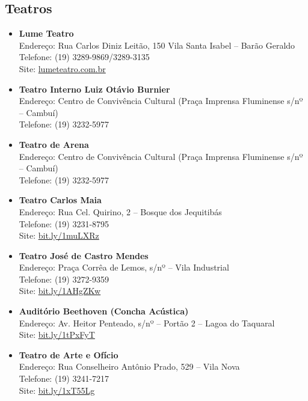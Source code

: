 \subsection{Teatros}

\begin{itemize}
\item \textbf{Lume Teatro}
  \\Endereço:  Rua Carlos Diniz Leitão, 150 Vila Santa Isabel -- Barão Geraldo
  \\Telefone: (19) 3289-9869/3289-3135
  \\Site: \url{lumeteatro.com.br}

\item \textbf{Teatro Interno Luiz Otávio Burnier}
  \\Endereço: Centro de Convivência Cultural (Praça Imprensa Fluminense s/nº --
  Cambuí)
  \\Telefone: (19) 3232-5977

\item \textbf{Teatro de Arena}
  \\Endereço: Centro de Convivência Cultural (Praça Imprensa Fluminense s/nº --
  Cambuí)
  \\Telefone: (19) 3232-5977

\item \textbf{Teatro Carlos Maia}
  \\Endereço: Rua Cel. Quirino, 2 -- Bosque dos Jequitibás
  \\Telefone: (19) 3231-8795
  \\Site: \url{bit.ly/1muLXRz}

\item \textbf{Teatro José de Castro Mendes}
  \\Endereço: Praça Corrêa de Lemos, s/nº -- Vila Industrial
  \\Telefone: (19) 3272-9359
  \\Site: \url{bit.ly/1AHgZKw}

\item \textbf{Auditório Beethoven (Concha Acústica)}
  \\Endereço: Av. Heitor Penteado, s/nº -- Portão 2 -- Lagoa do Taquaral
  \\Site: \url{bit.ly/1tPxFyT}

\item \textbf{Teatro de Arte e Ofício}
  \\Endereço: Rua Conselheiro Antônio Prado, 529 -- Vila Nova
  \\Telefone: (19) 3241-7217
  \\Site: \url{bit.ly/1xT55Lg}


\end{itemize}
